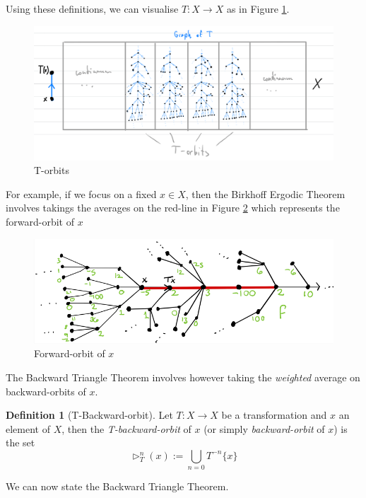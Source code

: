 \documentclass{article}
\theoremstyle{definition}
\newtheorem{definition}{Definition}[section]
\begin{document}
Using these definitions, we can visualise $T:X\to X$ as in Figure \ref{T-orbits}.

\begin{figure}[h]
    \centering
    \includegraphics[width=1\linewidth]{T-orbits.PNG}
    \caption{T-orbits}
    \label{T-orbits}
\end{figure}

For example, if we focus on a fixed $x\in X$, then the Birkhoff Ergodic Theorem involves takings the averages on the red-line in Figure \ref{forward-orbit} which represents the forward-orbit of $x$\\

\begin{figure}[h]
    \centering
    \includegraphics[width=1\linewidth]{forward-orbit.PNG}
    \caption{Forward-orbit of $x$}
    \label{forward-orbit}
\end{figure}

The Backward Triangle Theorem involves however taking the \textit{weighted} average on backward-orbits of $x$.

\begin{definition}[T-Backward-orbit]
    Let $T:X\to X$ be a transformation and $x$ an element of $X$, then the \textit{T-backward-orbit} of $x$ (or simply \textit{backward-orbit} of $x$) is the set 
    $$\rhd_T^n(x) := \bigcup_{n=0}T^{-n}\{x\}$$
\end{definition}

We can now state the Backward Triangle Theorem.
\end{document}
